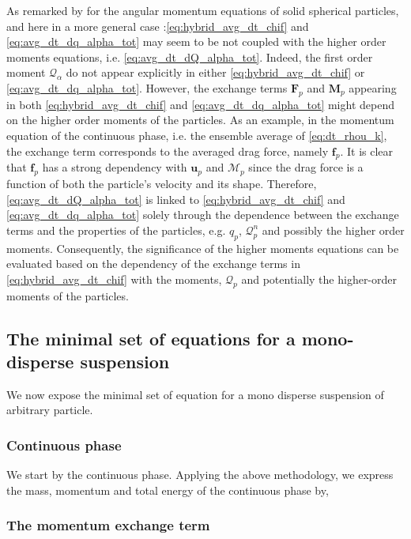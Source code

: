As remarked by \citet{jackson1997locally} for the angular momentum equations of solid spherical particles, and here in a more general case :\ref{eq:hybrid_avg_dt_chif} and \ref{eq:avg_dt_dq_alpha_tot} may seem to be not coupled with the higher order moments equations, i.e. \ref{eq:avg_dt_dQ_alpha_tot}. 
Indeed, the first order moment $\mathcal{Q}_\alpha$ do not appear explicitly in either \ref{eq:hybrid_avg_dt_chif} or \ref{eq:avg_dt_dq_alpha_tot}.
However, the exchange terms 
$\textbf{F}_p$ 
and 
$\textbf{M}_p$ 
appearing in both \ref{eq:hybrid_avg_dt_chif} and \ref{eq:avg_dt_dq_alpha_tot} might depend on the higher order moments of the particles.
As an example, in the momentum equation of the continuous phase, i.e. the ensemble average of \ref{eq:dt_rhou_k}, the exchange term corresponds to the averaged drag force, namely $\textbf{f}_p$. 
It is clear that $\textbf{f}_p$ has a strong dependency with $\textbf{u}_p$ and $\mathcal{M}_p$ since the drag force is a function of both the particle's velocity and its shape. 
Therefore, \ref{eq:avg_dt_dQ_alpha_tot} is linked to \ref{eq:hybrid_avg_dt_chif} and \ref{eq:avg_dt_dq_alpha_tot} solely through the dependence between the exchange terms and the properties of the particles, e.g. $q_p$, $\mathcal{Q}^n_p$ and possibly the higher order moments. 
Consequently, the significance of the higher moments equations can be evaluated based on the dependency of the exchange terms in \ref{eq:hybrid_avg_dt_chif} with the moments,  $\mathcal{Q}_p$ and potentially the higher-order moments of the particles. 

\subsection{The minimal set of equations for a mono-disperse suspension}
We now expose the minimal set of equation for a mono disperse suspension of arbitrary particle. 

\subsubsection{Continuous phase}

We start by the continuous phase. 
Applying the above methodology, we express the mass, momentum and total energy of the continuous phase by, 

\subsubsection{The momentum exchange term}

